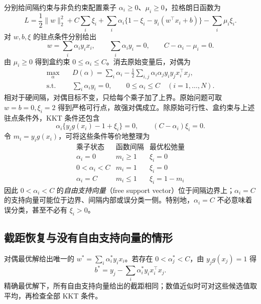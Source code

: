 分别给间隔约束与非负约束配置乘子 $\alpha_i\ge0$、$\mu_i\ge0$，拉格朗日函数为
\[
  L=\frac12\lVert w\rVert_2^2+C\sum_i\xi_i
    +\sum_i\alpha_i\{1-\xi_i-y_i(w^\top x_i+b)\}
    -\sum_i\mu_i\xi_i.
\]
对 $w,b,\xi$ 的驻点条件分别给出
\[
  w=\sum_i\alpha_i y_i x_i,
  \qquad\sum_i\alpha_i y_i=0,
  \qquad C-\alpha_i-\mu_i=0.
\]
由 $\mu_i\ge0$ 得到盒约束 $0\le\alpha_i\le C$。消去原始变量后，对偶为
\begin{equation}
  \begin{aligned}
    \max_\alpha\quad
      &D(\alpha)=\sum_i\alpha_i
        -\frac12\sum_{i,j}\alpha_i\alpha_j y_i y_j x_i^\top x_j,\\
    \text{s.t.}\quad
      &\sum_i\alpha_i y_i=0,\qquad
       0\le\alpha_i\le C\quad(i=1,\ldots,N).
  \end{aligned}
  \label{eq:lihang-svm-soft-dual}
\end{equation}
相对于硬间隔，对偶目标不变，只给每个乘子加了上界。原始问题可取 $w=b=0,\xi_i=2$ 得到严格可行点，故强对偶成立。除原始可行性、盒约束与上述驻点条件外，KKT 条件还包含
\begin{equation}
  \alpha_i\{y_i g(x_i)-1+\xi_i\}=0,
  \qquad (C-\alpha_i)\xi_i=0.
  \label{eq:lihang-svm-soft-complementarity}
\end{equation}
令 $m_i=y_i g(x_i)$，可将这些条件等价地整理为
\begin{equation}
  \begin{array}{c|c|c}
    \text{乘子状态}&\text{函数间隔}&\text{最优松弛量}\\ \hline
    \alpha_i=0&m_i\ge1&\xi_i=0\\
    0<\alpha_i<C&m_i=1&\xi_i=0\\
    \alpha_i=C&m_i\le1&\xi_i=1-m_i
  \end{array}
  \label{eq:lihang-svm-soft-status}
\end{equation}
因此 $0<\alpha_i<C$ 的\emph{自由支持向量}（free support vector）位于间隔边界上；$\alpha_i=C$ 的支持向量可能位于边界、间隔内部或误分类一侧。特别地，$\alpha_i=C$ 不必意味着误分类，甚至不必有 $\xi_i>0$。

\subsection{截距恢复与没有自由支持向量的情形}
\label{subsec:lihang-svm-intercept}

对偶最优解给出唯一的 $w^*=\sum_i\alpha_i^*y_i x_i$。若存在 $0<\alpha_j^*<C$，由 $y_jg(x_j)=1$ 得
\begin{equation}
  b^*=y_j-\sum_i\alpha_i^*y_i x_i^\top x_j.
  \label{eq:lihang-svm-soft-b-free}
\end{equation}
精确最优解下，所有自由支持向量给出的截距相同；数值近似时可对这些候选值取平均，再检查全部 KKT 条件。

